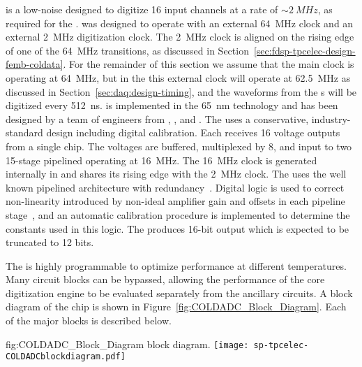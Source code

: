  is a low-noise   designed to digitize
\num{16} input channels at a rate of $\sim\SI{2}{MHz}$, as required for the
 .  was designed to operate with 
an external \SI{64}{MHz} clock and an external \SI{2}{MHz} digitization clock.
The \SI{2}{MHz} clock is aligned on the rising edge of one of
the \SI{64}{MHz} transitions, as discussed in Section~\ref{sec:fdsp-tpcelec-design-femb-coldata}.
For the remainder of this section we assume that the main clock is operating
at \SI{64}{MHz}, but in the   this external clock will operate at \SI{62.5}{MHz}
as discussed in Section~\ref{sec:daq:design-timing}, and the waveforms from
the s will be digitized every \SI{512}{ns}.
 is implemented in the 
\SI{65}{nm}  technology and has been designed by a team of engineers
from , , and .  The  uses a conservative,
industry-standard design including digital calibration.  Each 
receives \num{16} voltage outputs from a single  chip.  The voltages
are buffered, multiplexed by \num{8}, and input to two \num{15}-stage pipelined 
operating at \SI{16}{MHz}. The \SI{16}{MHz} clock is generated internally in
 and shares its rising edge with the \SI{2}{MHz} clock. 
The  uses the well known pipelined architecture
with redundancy~\cite{PipelinedADC}.  Digital logic is used to correct non-linearity
introduced by non-ideal amplifier gain and offsets in each pipeline
stage~\cite{CalibrationCorrection}, and an automatic calibration procedure is
implemented to determine the constants used in this logic.  The  produces
\num{16}-bit output which is expected to be truncated to \num{12} bits.

The  is highly programmable to optimize performance at different
temperatures.  Many circuit blocks can be bypassed, allowing the performance 
of the core digitization engine to be evaluated separately from the ancillary 
circuits. A block diagram of the chip is shown in Figure~\ref{fig:COLDADC_Block_Diagram}. 
Each of the major blocks is described below.

\begin{dunefigure}
{fig:COLDADC_Block_Diagram}
{ block diagram.}
\texttt{[image: sp-tpcelec-COLDADCblockdiagram.pdf]}
\end{dunefigure}


